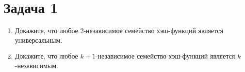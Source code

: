 \section{Задача 1}
\begin{enumerate}
\item Докажите, что любое 2-независимое семейство хэш-функций является универсальным.
\item Докажите, что любое $k+1$-независимое семейство хэш-функций является $k$-независимым.
\end{enumerate}
